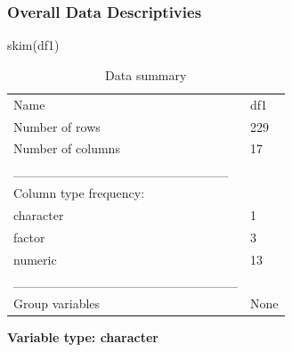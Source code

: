 \documentclass[
  letterpaper,
  DIV=11,
  numbers=noendperiod]{scrartcl}
\newenvironment{Shaded}{\begin{snugshade}}{\end{snugshade}}
\newcommand{\FunctionTok}[1]{\textcolor[rgb]{0.02,0.16,0.49}{#1}}
\newcommand{\NormalTok}[1]{\textcolor[rgb]{0.00,0.44,0.13}{#1}}
\begin{document}
\hypertarget{overall-data-descriptivies}{%
\subsubsection{Overall Data
Descriptivies}\label{overall-data-descriptivies}}

\begin{Shaded}
\begin{Highlighting}[]
\FunctionTok{skim}\NormalTok{(df1)}
\end{Highlighting}
\end{Shaded}

\begin{longtable}[]{@{}ll@{}}
\caption{Data summary}\tabularnewline
\toprule\noalign{}
\endfirsthead
\endhead
\bottomrule\noalign{}
\endlastfoot
Name & df1 \\
Number of rows & 229 \\
Number of columns & 17 \\
\_\_\_\_\_\_\_\_\_\_\_\_\_\_\_\_\_\_\_\_\_\_\_ & \\
Column type frequency: & \\
character & 1 \\
factor & 3 \\
numeric & 13 \\
\_\_\_\_\_\_\_\_\_\_\_\_\_\_\_\_\_\_\_\_\_\_\_\_ & \\
Group variables & None \\
\end{longtable}

\textbf{Variable type: character}
\end{document}

